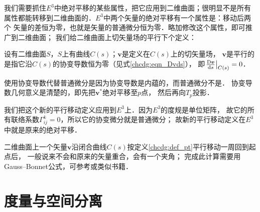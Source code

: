 我们需要抓住$E^3$中绝对平移的某些属性，把它应用到二维曲面；很明显不是所有
属性都能转移到二维曲面的．$E^3$中两个矢量的绝对平移有一个属性是：移动后两个
矢量的差恒为零，也就是矢量的普通微分恒为零．略加修改这个属性，即可推广到二维曲面；
我们给二维曲面上切矢量场的{\kaishu 平行}下个定义：

\begin{definition}\label{chcdg:def_pt}
    设有二维曲面$S$，$S$上有曲线$C(s)$；$\boldsymbol{v}$是定义在$C(s)$上的切矢量场，
    $\boldsymbol{v}$是{\heiti 平行的}是指它沿$C(s)$的协变导数恒为零（见式\eqref{chcdg:eqn_Dvds}），
    即$\left.\frac{{\rm D} \boldsymbol{v}}{{\rm d}s}\right|_{C(s)}=0$．
\end{definition}

使用协变导数代替普通微分是因为协变导数是内蕴的，而普通微分不是．
协变导数几何意义是清楚的，即先把$\boldsymbol{v}^*$绝对平移至$p$点，
然后再向$T_p$投影．

我们把这个新的平行移动定义应用到$E^3$上．因为$E^3$的度规是单位矩阵，
故它的所有联络系数$\Gamma^k_{ij}=0$，所以它的协变微分就是普通微分；
故新的平行移动定义在$E^3$中就是原来的绝对平移．




二维曲面上一个矢量$\boldsymbol{v}$沿闭合曲线$C(s)$按定义\ref{chcdg:def_pt}平行移动一周回到起点后，
一般说来不会和原来的矢量重合，会有一个夹角；
完成此计算需要用Gauss--Bonnet公式，可参考\parencite[\S 2.7.4]{subq-2016}或类似书籍．






\section{度量与空间分离}\label{chcdg:sec_sm}


